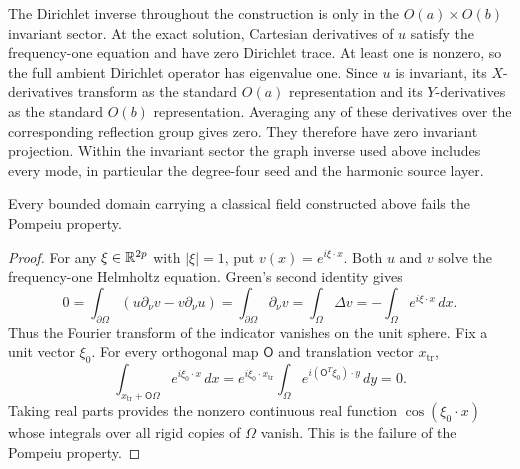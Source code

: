 \begin{remark}\label{inf:sector-distinction}
The Dirichlet inverse throughout the construction is only in the
$O(a)\times O(b)$ invariant sector. At the exact solution, Cartesian
derivatives of $u$ satisfy the frequency-one equation and have zero
Dirichlet trace. At least one is nonzero, so the full ambient
Dirichlet operator has eigenvalue one. Since $u$ is invariant,
its $X$-derivatives
transform as the standard $O(a)$ representation and its
$Y$-derivatives as the standard $O(b)$ representation. Averaging
any of these derivatives over the corresponding reflection group
gives zero. They therefore have zero invariant projection.
Within the invariant sector the graph inverse used above includes
every mode, in particular the degree-four seed and the harmonic
source layer.
\end{remark}

\begin{proposition}\label{inf:Pompeiu}
Every bounded domain carrying a classical field constructed above fails
the Pompeiu property.
\end{proposition}
\begin{proof}
For any $\xi\in\mathbb{R}^{2p}$ with $|\xi|=1$, put
$v(x)=e^{i\xi\cdot x}$. Both $u$ and $v$ solve the frequency-one
Helmholtz equation. Green's second identity gives
\[
 0=\int_{\partial\Omega}(u\partial_\nu v-v\partial_\nu u)
   =\int_{\partial\Omega}\partial_\nu v
   =\int_\Omega\Delta v=-\int_\Omega e^{i\xi\cdot x}\,dx.
\]
Thus the Fourier transform of the indicator vanishes on the unit
sphere. Fix a unit vector $\xi_0$.
For every orthogonal map $\mathsf O$ and translation vector $x_{\mathrm{tr}}$,
\[
 \int_{x_{\mathrm{tr}}+\mathsf O\Omega}e^{i\xi_0\cdot x}\,dx
 =e^{i\xi_0\cdot x_{\mathrm{tr}}}\int_\Omega e^{i(\mathsf O^T\xi_0)\cdot y}\,dy=0.
\]
Taking real parts provides the nonzero continuous real function
$\cos(\xi_0\cdot x)$ whose integrals over all rigid copies of
$\Omega$ vanish. This is the failure of the Pompeiu property.
\end{proof}

